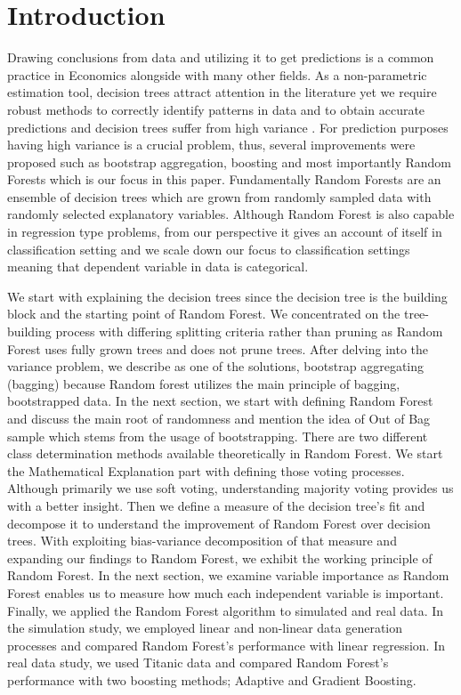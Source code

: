 \section{Introduction}
\label{ch:intro}

Drawing conclusions from data and utilizing it to get predictions is a common practice in Economics alongside with many other fields. 
As a non-parametric estimation tool, decision trees attract attention in the literature 
yet we require robust methods to correctly identify patterns in data and to obtain accurate predictions 
and decision trees suffer from high variance \cite{friedman2001elements}. 
For prediction purposes having high variance is a crucial problem, thus, several improvements were proposed 
such as bootstrap aggregation, boosting and most importantly Random Forests which is our focus in this paper. 
Fundamentally Random Forests are an ensemble of decision trees which are grown from randomly sampled data with 
randomly selected explanatory variables. 
Although Random Forest is also capable in regression type problems, 
from our perspective it gives an account of itself in classification setting and we scale down our focus to classification 
settings meaning that dependent variable in data is categorical. 


We start with explaining the decision trees since the decision tree is the building block and the starting point of Random Forest.
We concentrated on the tree-building process with differing splitting criteria rather than pruning 
as Random Forest uses fully grown trees and does not prune trees. 
After delving into the variance problem, we describe as one of the solutions, bootstrap aggregating (bagging) 
because Random forest utilizes the main principle of bagging, bootstrapped data. 
In the next section, we start with defining Random Forest and discuss the main root of randomness and mention the idea of 
Out of Bag sample which stems from the usage of bootstrapping.
There are two different class determination methods available theoretically in Random Forest. 
We start the Mathematical Explanation part with defining those voting processes. 
Although primarily we use soft voting, understanding majority voting provides us with a better insight.
Then we define a measure of the decision tree's fit and decompose it to understand the improvement of Random Forest over decision trees.
With exploiting bias-variance decomposition of that measure and expanding our findings to Random Forest, 
we exhibit the working principle of Random Forest.
In the next section, we examine variable importance as Random Forest enables us to measure 
how much each independent variable is important.
Finally, we applied the Random Forest algorithm to simulated and real data. 
In the simulation study, we employed linear and non-linear data generation processes and compared Random Forest's performance with linear regression.
In real data study, we used Titanic data \cite{titanicData} and compared Random Forest's performance with two boosting methods; Adaptive and Gradient Boosting.